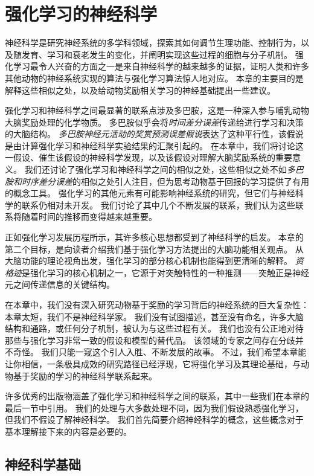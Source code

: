 \chapter{强化学习的神经科学} \label{chap:chap12}


神经科学是研究神经系统的多学科领域，探索其如何调节生理功能、控制行为，以及随发育、学习和衰老发生的变化，并阐明实现这些过程的细胞与分子机制。
强化学习最令人兴奋的方面之一是来自神经科学的越来越多的证据，证明人类和许多其他动物的神经系统实现的算法与强化学习算法惊人地对应。
本章的主要目的是解释这些相似之处，以及给动物奖励相关学习的神经基础提出一些建议。


强化学习和神经科学之间最显著的联系点涉及多巴胺，这是一种深入参与哺乳动物大脑奖励处理的化学物质。
多巴胺似乎会将\textit{时间差分误差}传递给进行学习和决策的大脑结构。
\textit{多巴胺神经元活动的奖赏预测误差假说}表达了这种平行性，该假说是由计算强化学习和神经科学实验结果的汇聚引起的。
在本章中，我们将讨论这一假设、催生该假设的神经科学发现，以及该假设对理解大脑奖励系统的重要意义。
我们还讨论了强化学习和神经科学之间的相似之处，这些相似之处不如\textit{多巴胺和时序差分误差}的相似之处引人注目，但为思考动物基于回报的学习提供了有用的概念工具。
强化学习的其他元素有可能影响神经系统的研究，但它们与神经科学的联系仍相对未开发。
我们讨论了其中几个不断发展的联系，我们认为这些联系将随着时间的推移而变得越来越重要。


正如强化学习发展历程所示，其许多核心思想都受到了神经科学的启发。
本章的第二个目标，是向读者介绍我们基于强化学习方法提出的大脑功能相关观点。
从大脑功能的理论视角出发，强化学习的部分核心机制也能得到更清晰的解释。
\textit{资格迹}是强化学习的核心机制之一，它源于对突触特性的一种推测——突触正是神经元之间传递信息的关键结构。


在本章中，我们没有深入研究动物基于奖励的学习背后的神经系统的巨大复杂性：本章太短，我们不是神经科学家。
我们没有试图描述，甚至没有命名，许多大脑结构和通路，或任何分子机制，被认为与这些过程有关。
我们也没有公正地对待那些与强化学习非常一致的假设和模型的替代品。
该领域的专家之间存在分歧并不奇怪。
我们只能一窥这个引人入胜、不断发展的故事。
不过，我们希望本章能让你相信，一条极具成效的研究路径已经浮现，它将强化学习及其理论基础，与动物基于奖励的学习的神经科学联系起来。


许多优秀的出版物涵盖了强化学习和神经科学之间的联系，其中一些我们在本章的最后一节中引用。
我们的处理与大多数处理不同，因为我们假设熟悉强化学习，但我们不假设了解神经科学。
我们首先简要介绍神经科学的概念，这些概念对于基本理解接下来的内容是必要的。



\section{神经科学基础} \label{sec:neuroscience_basics}

